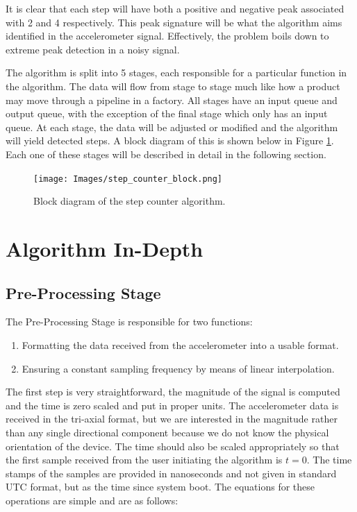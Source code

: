         It is clear that each step will have both a positive and negative peak associated with 2 and 4 respectively. This peak signature will be what the algorithm aims identified in the accelerometer signal. Effectively, the problem boils down to extreme peak detection in a noisy signal. 

        The algorithm is split into 5 stages, each responsible for a particular function in the algorithm. The data will flow from stage to stage much like how a product may move through a pipeline in a factory. All stages have an input queue and output queue, with the exception of the final stage which only has an input queue. At each stage, the data will be adjusted or modified and the algorithm will yield detected steps. A block diagram of this is shown below in Figure \ref{img_sc_block}. Each one of these stages will be described in detail in the following section.

        \begin{figure}[h]
            \texttt{[image: Images/step\_counter\_block.png]}
            \centering
            \caption{Block diagram of the step counter algorithm.}
            \label{img_sc_block}
        \end{figure}

    \chapter{Algorithm In-Depth}

        \section{Pre-Processing Stage}

            The Pre-Processing Stage is responsible for two functions:

            \begin{enumerate}
                \item Formatting the data received from the accelerometer into a usable format.
                \item Ensuring a constant sampling frequency by means of linear interpolation.
            \end{enumerate}

            The first step is very straightforward, the magnitude of the signal is computed and the time is zero scaled and put in proper units. The accelerometer data is received in the tri-axial format, but we are interested in the magnitude rather than any single directional component because we do not know the physical orientation of the device. The time should also be scaled appropriately so that the first sample received from the user initiating the algorithm is $t = 0$. The time stamps of the samples are provided in nanoseconds and not given in standard UTC format, but as the time since system boot. The equations for these operations are simple and are as follows:

